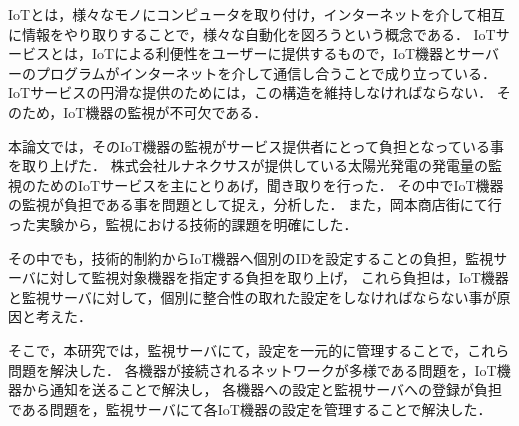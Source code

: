 IoTとは，様々なモノにコンピュータを取り付け，インターネットを介して相互に情報をやり取りすることで，様々な自動化を図ろうという概念である．
IoTサービスとは，IoTによる利便性をユーザーに提供するもので，IoT機器とサーバーのプログラムがインターネットを介して通信し合うことで成り立っている．
IoTサービスの円滑な提供のためには，この構造を維持しなければならない．
そのため，IoT機器の監視が不可欠である．
\medskip

本論文では，そのIoT機器の監視がサービス提供者にとって負担となっている事を取り上げた．
株式会社ルナネクサスが提供している太陽光発電の発電量の監視のためのIoTサービスを主にとりあげ，聞き取りを行った．
その中でIoT機器の監視が負担である事を問題として捉え，分析した．
また，岡本商店街にて行った実験から，監視における技術的課題を明確にした．

その中でも，技術的制約からIoT機器へ個別のIDを設定することの負担，監視サーバに対して監視対象機器を指定する負担を取り上げ，
これら負担は，IoT機器と監視サーバに対して，個別に整合性の取れた設定をしなければならない事が原因と考えた．


\begin{comment}
IoT機器の監視には，次のような技術的課題があることが分かった．
\begin{itemize}
\item ネットワークの監視はIoTサービスが提供する機能とは別の機能である事
\item IoT機器の接続されるネットワークは想定できない事
\item IoT機器の接続されるネットワークがプライベートアドレスである場合が多い事
\item IoT機器は大量に利用される為，サーバへ設定することが負担となること
\end{itemize}
\medskip

そこで，本研究では，IoT機器から通知を送ることで，IoT機器が接続されるネットワークによらない機器の監視を実現し，IoTサービスとは別個の機器監視サービスとして開発することで，提供者の負担を軽減することを提案した．
既存手法では何が足りないのか議論し，IoTサービスの実践やサービス提供者への聞き取りを通して，サービスに必要な要件を抽出し，設計を行った．
\end{comment}

そこで，本研究では，監視サーバにて，設定を一元的に管理することで，これら問題を解決した．
各機器が接続されるネットワークが多様である問題を，IoT機器から通知を送ることで解決し，
各機器への設定と監視サーバへの登録が負担である問題を，監視サーバにて各IoT機器の設定を管理することで解決した．

